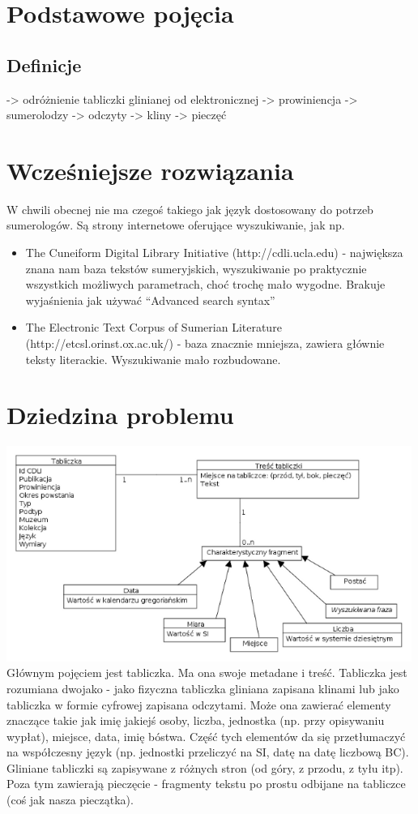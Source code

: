 \documentclass{pracamgr}
\begin{document}
\chapter{Podstawowe pojęcia}\label{r:pojecia}
\section{Definicje}
-> odróżnienie tabliczki glinianej od elektronicznej
-> prowiniencja
-> sumerolodzy
-> odczyty
-> kliny
-> pieczęć



\chapter{Wcześniejsze rozwiązania}\label{r:losers}
W chwili obecnej nie ma czegoś takiego jak język dostosowany do potrzeb sumerologów. Są strony internetowe oferujące wyszukiwanie, 
jak np.
\begin{itemize}
\item The Cuneiform Digital Library Initiative (http://cdli.ucla.edu) - największa znana nam baza tekstów sumeryjskich, 
wyszukiwanie po praktycznie wszystkich możliwych parametrach, choć trochę mało wygodne. Brakuje wyjaśnienia jak 
używać ``Advanced search syntax''
\item The Electronic Text Corpus of Sumerian Literature (http://etcsl.orinst.ox.ac.uk/) - baza znacznie mniejsza, zawiera 
głównie teksty literackie. Wyszukiwanie mało rozbudowane.
\end{itemize}

\chapter{Dziedzina problemu}
\includegraphics[width=500px]{diagramy/Model-dziedziny.png}
Głównym pojęciem jest tabliczka. Ma ona swoje metadane i treść. Tabliczka jest rozumiana dwojako - jako fizyczna tabliczka gliniana
zapisana klinami lub jako tabliczka w formie cyfrowej zapisana odczytami. Może ona zawierać elementy znaczące takie jak imię jakiejś 
osoby, liczba, jednostka (np. przy opisywaniu wypłat), miejsce, data, imię bóstwa. Część tych elementów da się przetłumaczyć na 
współczesny język (np. jednostki przeliczyć na SI, datę na datę liczbową BC). Gliniane tabliczki są zapisywane z różnych stron 
(od góry, z przodu, z tyłu itp). Poza tym zawierają pieczęcie - fragmenty tekstu po prostu odbijane na tabliczce (coś jak nasza
pieczątka). 
\end{document}
